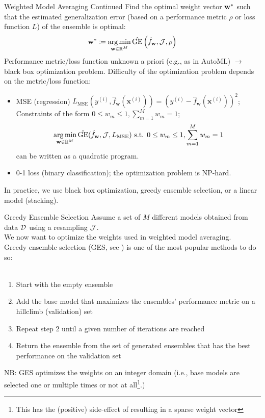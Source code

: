 \documentclass[10pt,compress,t,notes=noshow, xcolor=table]{beamer}
\begin{document}
\begin{frame}{Weighted Model Averaging Continued}
Find the optimal weight vector $\mathbf{w}^{*}$ such that the estimated generalization error (based on a performance metric $\rho$ or loss function $L$) of the ensemble is optimal:
$$\mathbf{w}^{*} \coloneqq \operatorname*{arg\,min}_{\mathbf{w} \in \mathbb{R}^{M}} \hat{\text{GE}}\left(\hat{f}_{\mathbf{w}}, \mathcal{J}, \rho\right)$$
\vfill
Performance metric/loss function unknown a priori (e.g., as in AutoML) $\rightarrow$ black box optimization problem.
\vfill
Difficulty of the optimization problem depends on the metric/loss function:
\begin{itemize}
    \item MSE (regression) $L_{\mathrm{MSE}}(y^{(i)}, \hat{f}_{\mathbf{w}}(\mathbf{x}^{(i)})) = (y^{(i)} - \hat{f}_{\mathbf{w}}(\mathbf{x}^{(i)}))^{2}$;\\
          Constraints of the form $0 \le w_{m} \le 1, \sum_{m=1}^{M} w_{m} = 1$;\\
          $$\operatorname*{arg\,min}_{\mathbf{w} \in \mathbb{R}^{M}} \hat{\text{GE}}(\hat{f}_{\mathbf{w}}, \mathcal{J}, L_{\mathrm{MSE}}) \text{ s.t. } 0 \le w_{m} \le 1, \sum_{m=1}^{M} w_{m} = 1$$ 
          can be written as a quadratic program.
    \item 0-1 loss (binary classification); the optimization problem is NP-hard.
\end{itemize}
\vfill
In practice, we use black box optimization, greedy ensemble selection, or a linear model (stacking).
\end{frame}



\begin{vbframe}{Greedy Ensemble Selection}
Assume a set of $M$ different models obtained from data $\mathcal{D}$ using a resampling $\mathcal{J}$.\\
We now want to optimize the weights used in weighted model averaging.\\
\vfill
Greedy ensemble selection (GES, see \href{https://www.cs.cornell.edu/~alexn/papers/shotgun.icml04.revised.rev2.pdf}{}) is one of the most popular methods to do so:\\\
\begin{enumerate}
    \item Start with the empty ensemble
    \item Add the base model that maximizes the ensembles' performance metric on a hillclimb (validation) set
    \item Repeat step 2 until a given number of iterations are reached
    \item Return the ensemble from the set of generated ensembles that has the best performance on the validation set
\end{enumerate}
\vfill
NB: GES optimizes the weights on an integer domain (i.e., base models are selected one or multiple times or not at all\footnote{This has the (positive) side-effect of resulting in a sparse weight vector}.)
\end{vbframe}
\end{document}
